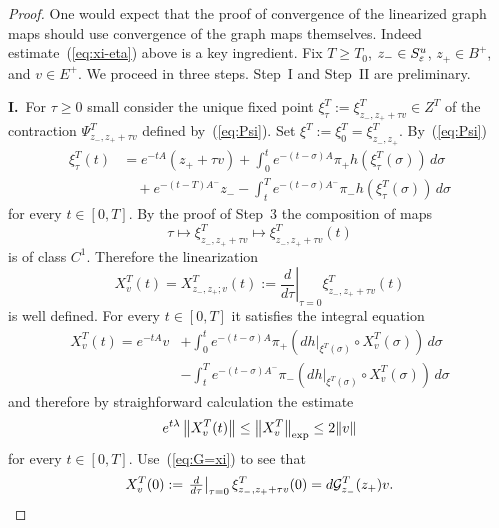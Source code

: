 \documentclass{article}
\begin{document}
\begin{proof}
One would expect that the proof of convergence 
of the linearized graph maps should use convergence
of the graph maps themselves.
Indeed estimate~(\ref{eq:xi-eta}) above
is a key ingredient.
Fix $T\ge T_0$, ${z_-}\in S^u_{\varepsilon}$,
$z_+\in B^+$, and $v\in E^+$.
We proceed in three steps. Step~I and Step~II
are preliminary.

{\bf I.}~For $\tau\ge 0$ small consider the unique
fixed
point $\xi^T_\tau:=\xi^T_{{z_-},z_++\tau v}\in Z^T$
of the contraction $\Psi^T_{{z_-},z_++\tau v}$
defined by~(\ref{eq:Psi}). Set $\xi^T:=\xi^T_0
=\xi^T_{{z_-},z_+}$. By~(\ref{eq:Psi})
\begin{equation}\label{eq:xiT-tau}
\begin{split}
     \xi^T_\tau(t)
    &=
     e^{-tA}\left(z_++\tau v\right)
     +\int_0^t e^{-(t-\sigma)A}\pi_+
     h(\xi^T_\tau(\sigma))\, d\sigma\\
    &\quad
     +e^{-(t-T)A^-}{z_-}-\int_t^T e^{-(t-\sigma)A^-}
     \pi_- h(\xi^T_\tau(\sigma))\, d\sigma
\end{split}
\end{equation}
for every $t\in[0,T]$. By the proof of Step~3 the
composition of maps
$$
     \tau
     \mapsto \xi^T_{{z_-},z_++\tau v}
     \mapsto \xi^T_{{z_-},z_++\tau v} (t)
$$
is of class $C^1$. Therefore the linearization
\begin{equation}\label{eq:def-X_v^T}
     X^T_v(t)
     =X^T_{{z_-},z_+;v}(t)
     :=\left.\frac{d}{d\tau}\right|_{\tau=0}
     \xi^T_{{z_-},z_++\tau v}(t)
\end{equation}
is well defined. For every $t\in[0,T]$
it satisfies the integral equation
\begin{equation}\label{eq:X_v^T}
\begin{split}
     X^T_v(t)
     =e^{-tA} v
    &+\int_0^t e^{-(t-\sigma)A}\pi_+
     \left( dh|_{\xi^T(\sigma)}\circ
     X_v^T(\sigma)\right)\, d\sigma\\
    &-\int_t^T e^{-(t-\sigma)A^-}\pi_-
     \left( dh|_{\xi^T(\sigma)}\circ
     X_v^T(\sigma)\right)\, d\sigma
\end{split}
\end{equation}
and therefore by straighforward calculation
the estimate
\begin{equation}\label{eq:X-exp}
     e^{t\lambda} \Norm{X^T_v(t)}
     \le\Norm{X_v^T}_{\exp}
     \le 2\norm{v}
\end{equation}
for every $t\in[0,T]$.
Use~(\ref{eq:G=xi}) to see that
\begin{equation}\label{eq:X_v^T=dG}
     X_v^T(0)
     :=\left.\tfrac{d}{d\tau}\right|_{\tau=0}
     \xi^T_{{z_-},z_++\tau v}(0)
     =d\Gg^T_{z_-}(z_+) v.
\end{equation}


\end{proof}
\end{document}
